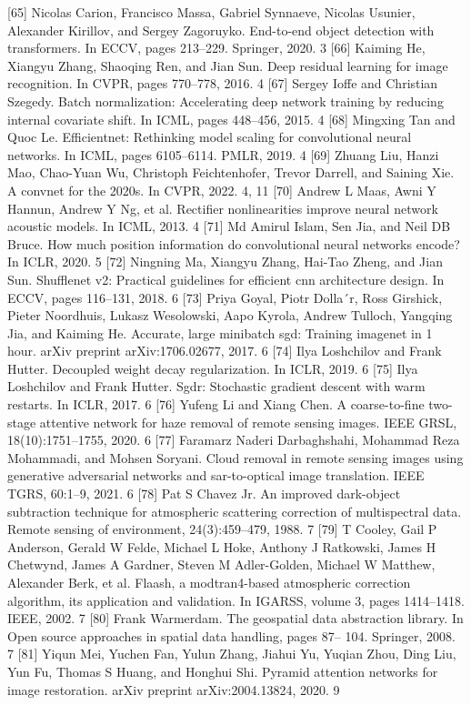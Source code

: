 [65] Nicolas Carion, Francisco Massa, Gabriel Synnaeve, Nicolas Usunier, Alexander Kirillov, and Sergey Zagoruyko. End-to-end object detection with transformers. In ECCV, pages 213–229. Springer, 2020. 3
[66] Kaiming He, Xiangyu Zhang, Shaoqing Ren, and Jian Sun. Deep residual learning for image recognition. In CVPR, pages 770–778, 2016. 4
[67] Sergey Ioffe and Christian Szegedy. Batch normalization: Accelerating deep network training by reducing internal covariate shift. In ICML, pages 448–456, 2015. 4
[68] Mingxing Tan and Quoc Le. Efficientnet: Rethinking model scaling for convolutional neural networks. In ICML, pages 6105–6114. PMLR, 2019. 4
[69] Zhuang Liu, Hanzi Mao, Chao-Yuan Wu, Christoph Feichtenhofer, Trevor Darrell, and Saining Xie. A convnet for the 2020s. In CVPR, 2022. 4, 11
[70] Andrew L Maas, Awni Y Hannun, Andrew Y Ng, et al. Rectifier nonlinearities improve neural network acoustic models. In ICML, 2013. 4
[71] Md Amirul Islam, Sen Jia, and Neil DB Bruce. How much position information do convolutional neural networks encode? In ICLR, 2020. 5
[72] Ningning Ma, Xiangyu Zhang, Hai-Tao Zheng, and Jian Sun. Shufflenet v2: Practical guidelines for efficient cnn architecture design. In ECCV, pages 116–131, 2018. 6
[73] Priya Goyal, Piotr Dolla´r, Ross Girshick, Pieter Noordhuis, Lukasz Wesolowski, Aapo Kyrola, Andrew Tulloch, Yangqing Jia, and Kaiming He. Accurate, large minibatch sgd: Training imagenet in 1 hour. arXiv preprint arXiv:1706.02677, 2017. 6
[74] Ilya Loshchilov and Frank Hutter. Decoupled weight decay regularization. In ICLR, 2019. 6
[75] Ilya Loshchilov and Frank Hutter. Sgdr: Stochastic gradient descent with warm restarts. In ICLR, 2017. 6
[76] Yufeng Li and Xiang Chen. A coarse-to-fine two-stage attentive network for haze removal of remote sensing images. IEEE GRSL, 18(10):1751–1755, 2020. 6
[77] Faramarz Naderi Darbaghshahi, Mohammad Reza Mohammadi, and Mohsen Soryani. Cloud removal in remote sensing images using generative adversarial networks and sar-to-optical image translation. IEEE TGRS, 60:1–9, 2021. 6
[78] Pat S Chavez Jr. An improved dark-object subtraction technique for atmospheric scattering correction of multispectral data. Remote sensing of environment, 24(3):459–479, 1988. 7
[79] T Cooley, Gail P Anderson, Gerald W Felde, Michael L Hoke, Anthony J Ratkowski, James H Chetwynd, James A Gardner, Steven M Adler-Golden, Michael W Matthew, Alexander Berk, et al. Flaash, a modtran4-based atmospheric correction algorithm, its application and validation. In IGARSS, volume 3, pages 1414–1418. IEEE, 2002. 7
[80] Frank Warmerdam. The geospatial data abstraction library. In Open source approaches in spatial data handling, pages 87– 104. Springer, 2008. 7
[81] Yiqun Mei, Yuchen Fan, Yulun Zhang, Jiahui Yu, Yuqian Zhou, Ding Liu, Yun Fu, Thomas S Huang, and Honghui Shi. Pyramid attention networks for image restoration. arXiv preprint arXiv:2004.13824, 2020. 9
